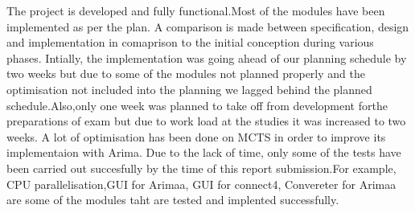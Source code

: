 The project is developed and fully functional.Most of the modules have been implemented as per the plan.
A comparison is made between specification, design and implementation in comaprison to the initial conception during various phases.
Intially, the implementation was going ahead of our planning schedule by two weeks but due to some of the modules not planned properly and the optimisation not included into the  planning we lagged behind the planned schedule.Also,only one week was planned to take off from development forthe preparations of exam but due to work load at the studies it was increased to two weeks. A lot of optimisation has been done on MCTS in order to improve its implementaion with Arima.
Due to the lack of time, only some of the tests have been carried out succesfully by the time of this report submission.For example, CPU parallelisation,GUI for Arimaa, GUI for connect4, Convereter for Arimaa are some of the modules taht are tested and implented successfully.